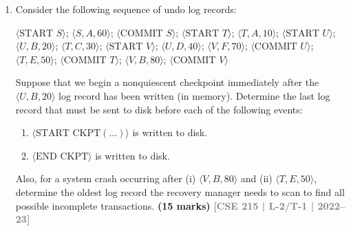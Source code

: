 \documentclass[12pt]{article}
\newcommand{\yr}[1]{\hfill\textcolor{gray}{\small\textbf{[#1]}}}
\newcommand{\mk}[1]{\textcolor{orange!70!black}{\small\textbf{(#1 marks)}}}
\begin{document}
\begin{enumerate}
\item Consider the following sequence of undo log records:
\begin{center}
\small\ttfamily
$\langle\text{START } S\rangle$; $\langle S, A, 60\rangle$; $\langle\text{COMMIT } S\rangle$; $\langle\text{START } T\rangle$; $\langle T, A, 10\rangle$; 
$\langle\text{START } U\rangle$; $\langle U, B, 20\rangle$; $\langle T, C, 30\rangle$; $\langle\text{START } V\rangle$; $\langle U, D, 40\rangle$; $\langle V, F, 70\rangle$; 
$\langle\text{COMMIT } U\rangle$; $\langle T, E, 50\rangle$; $\langle\text{COMMIT } T\rangle$; $\langle V, B, 80\rangle$; $\langle\text{COMMIT } V\rangle$ 
\end{center}
Suppose that we begin a nonquiescent checkpoint immediately after the $\langle U, B, 20\rangle$ log record has been written (in memory). Determine the last log record that must be sent to disk before each of the following events:
\begin{enumerate}
  \item $\langle\text{START CKPT}(\ldots)\rangle$ is written to disk.
  \item $\langle\text{END CKPT}\rangle$ is written to disk.
\end{enumerate}
Also, for a system crash occurring after (i) $\langle V, B, 80\rangle$ and (ii) $\langle T, E, 50\rangle$, determine the oldest log record the recovery manager needs to scan to find all possible incomplete transactions.
\mk{15} \yr{CSE 215 | L-2/T-1 | 2022--23}



\end{enumerate}
\end{document}
